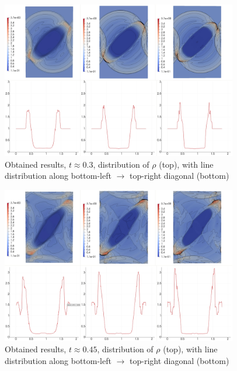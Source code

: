 \begin{figure}[H]
	\begin{center}
		\includegraphics[width=0.92\textwidth]{img/mhd-blast/new/blast,1noadapt5.jpg}
\vspace{-3mm}
	\caption{Obtained results, $t \approx 0.3$, distribution of $\rho$ (top), with line distribution along bottom-left $\rightarrow$ top-right diagonal (bottom)}
	\label{figure:blastNew13}
	\end{center}
\end{figure}
\vspace{-10mm}

\begin{figure}[H]
	\begin{center}
		\includegraphics[width=0.92\textwidth]{img/mhd-blast/new/blast,1noadapt9.jpg}
\vspace{-3mm}
	\caption{Obtained results, $t \approx 0.45$, distribution of $\rho$ (top), with line distribution along bottom-left $\rightarrow$ top-right diagonal (bottom)}
	\label{figure:blastNew14}
	\end{center}
\end{figure}
\vspace{-10mm}

